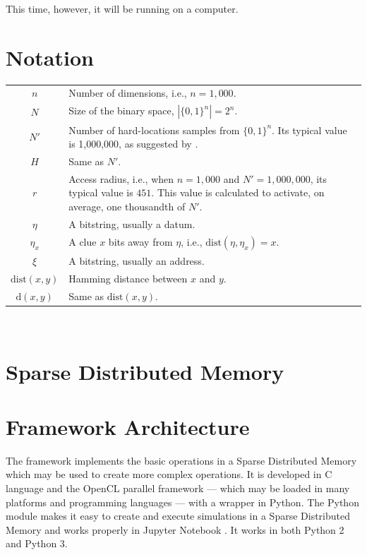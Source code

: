 This time, however, it will be running on a computer.

\chapter{Notation}

\begin{tabular}{cp{\textwidth}}
  $n$ & Number of dimensions, i.e., $n=1,000$. \\
  $N$ & Size of the binary space, $|\{0, 1\}^n| = 2^n$. \\
  $N'$ & Number of hard-locations samples from $\{0, 1\}^n$. Its typical value is 1,000,000, as suggested by \citet{Kanerva1988}. \\
  $H$ & Same as $N'$. \\
  $r$ & Access radius, i.e., when $n=1,000$ and $N'=1,000,000$, its typical value is $451$. This value is calculated to activate, on average, one thousandth of $N'$. \\
  $\eta$ & A bitstring, usually a datum. \\
  $\eta_x$ & A clue $x$ bits away from $\eta$, i.e., $\text{dist}(\eta, \eta_x) = x$. \\
  $\xi$ & A bitstring, usually an address. \\
  $\text{dist}(x, y)$ & Hamming distance between $x$ and $y$. \\
  $\text{d}(x, y)$ & Same as $\text{dist}(x, y)$.
\end{tabular}\\

\chapter{Sparse Distributed Memory}




\chapter{Framework Architecture}

The framework implements the basic operations in a Sparse Distributed Memory which may be used to create more complex operations. It is developed in C language and the OpenCL parallel framework --- which may be loaded in many platforms and programming languages --- with a wrapper in Python. The Python module makes it easy to create and execute simulations in a Sparse Distributed Memory and works properly in Jupyter Notebook \citep{kluyver2016jupyter}. It works in both Python 2 and Python 3.

